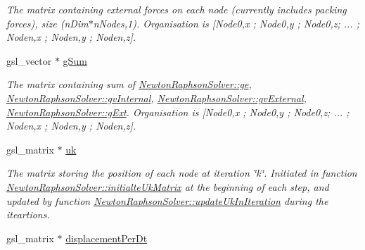 \begin{DoxyCompactItemize}
\begin{DoxyCompactList}\small\item\em The matrix containing external forces on each node (currently includes packing forces), size (n\+Dim$\ast$n\+Nodes,1). Organisation is \mbox{[}Node0,x ; Node0,y ; Node0,z; ... ; Noden,x ; Noden,y ; Noden,z\mbox{]}. \end{DoxyCompactList}\item 
\hypertarget{classNewtonRaphsonSolver_a843bd105e92dfa1c9205e4efa134a406}{}gsl\+\_\+vector $\ast$ \hyperlink{classNewtonRaphsonSolver_a843bd105e92dfa1c9205e4efa134a406}{g\+Sum}\label{classNewtonRaphsonSolver_a843bd105e92dfa1c9205e4efa134a406}

\begin{DoxyCompactList}\small\item\em The matrix containing sum of \hyperlink{classNewtonRaphsonSolver_a3b2a215e49d3c1d6d12eb7c8c73e9ff6}{Newton\+Raphson\+Solver\+::ge}, \hyperlink{classNewtonRaphsonSolver_a79fd12919ceb329bc177f16f3ce897b6}{Newton\+Raphson\+Solver\+::gv\+Internal}, \hyperlink{classNewtonRaphsonSolver_a80160d7bfb04a39e3b8910b68f66aa6d}{Newton\+Raphson\+Solver\+::gv\+External}, \hyperlink{classNewtonRaphsonSolver_afee5ceb54c8d439c1044ad3997d079ea}{Newton\+Raphson\+Solver\+::g\+Ext}. Organisation is \mbox{[}Node0,x ; Node0,y ; Node0,z; ... ; Noden,x ; Noden,y ; Noden,z\mbox{]}. \end{DoxyCompactList}\item 
\hypertarget{classNewtonRaphsonSolver_ad217268afdeb4838d3b58f075762de95}{}gsl\+\_\+matrix $\ast$ \hyperlink{classNewtonRaphsonSolver_ad217268afdeb4838d3b58f075762de95}{uk}\label{classNewtonRaphsonSolver_ad217268afdeb4838d3b58f075762de95}

\begin{DoxyCompactList}\small\item\em The matrix storing the position of each node at iteration \char`\"{}k\char`\"{}. Initiated in function \hyperlink{classNewtonRaphsonSolver_a48b7753542f36889cd030104937d76a3}{Newton\+Raphson\+Solver\+::initialte\+Uk\+Matrix} at the beginning of each step, and updated by function \hyperlink{classNewtonRaphsonSolver_a5e457b3608c6fbd71767cd6eed07b2f7}{Newton\+Raphson\+Solver\+::update\+Uk\+In\+Iteration} during the iteartions. \end{DoxyCompactList}\item 
\hypertarget{classNewtonRaphsonSolver_a5c25883f25c52190ea88893ede622e6b}{}gsl\+\_\+matrix $\ast$ \hyperlink{classNewtonRaphsonSolver_a5c25883f25c52190ea88893ede622e6b}{displacement\+Per\+Dt}\label{classNewtonRaphsonSolver_a5c25883f25c52190ea88893ede622e6b}


\end{DoxyCompactItemize}
